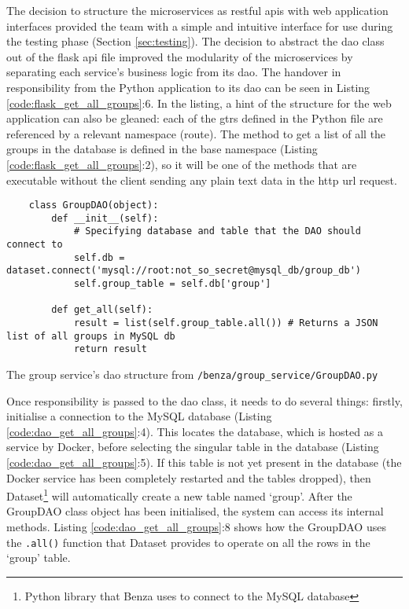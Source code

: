 \documentclass{article}
\begin{document}
    The decision to structure the microservices as \gls{restful} \acrshort{api}s with web application interfaces provided the team with a simple and intuitive interface for use during the testing phase (Section \ref{sec:testing}). The decision to abstract the \acrshort{dao} class out of the flask \acrshort{api} file improved the modularity of the microservices by separating each service's business logic from its \acrfull{dao}. The handover in responsibility from the Python application to its \acrlong{dao} can be seen in Listing \ref{code:flask_get_all_groups}:6. In the listing, a hint of the structure for the web application can also be gleaned: each of the \glspl{gtr} defined in the Python file are referenced by a relevant namespace (route). The method to get a list of all the groups in the database is defined in the base namespace (Listing \ref{code:flask_get_all_groups}:2), so it will be one of the methods that are executable without the client sending any plain text data in the \acrshort{http} \acrshort{url} request. \par
    
    \begin{listing}[ht]
    \begin{verbatim}
    class GroupDAO(object):
        def __init__(self):
            # Specifying database and table that the DAO should connect to
            self.db = dataset.connect('mysql://root:not_so_secret@mysql_db/group_db')
            self.group_table = self.db['group']
    
        def get_all(self):
            result = list(self.group_table.all()) # Returns a JSON list of all groups in MySQL db
            return result
    \end{verbatim}
    \caption{The group service's \acrshort{dao} structure from \texttt{/benza/group_service/GroupDAO.py}}
    \label{code:dao_get_all_groups}
    \end{listing}
    
    Once responsibility is passed to the \acrshort{dao} class, it needs to do several things: firstly, initialise a connection to the MySQL database (Listing \ref{code:dao_get_all_groups}:4). This locates the database, which is hosted as a service by Docker, before selecting the singular table in the database (Listing \ref{code:dao_get_all_groups}:5). If this table is not yet present in the database (the Docker service has been completely restarted and the tables dropped), then Dataset\footnote{Python library that Benza uses to connect to the MySQL database} will automatically create a new table named `group'. After the GroupDAO class object has been initialised, the system can access its internal methods. Listing \ref{code:dao_get_all_groups}:8 shows how the GroupDAO uses the \texttt{.all()} function that Dataset provides to operate on all the rows in the `group' table. \par
    
\end{document}
